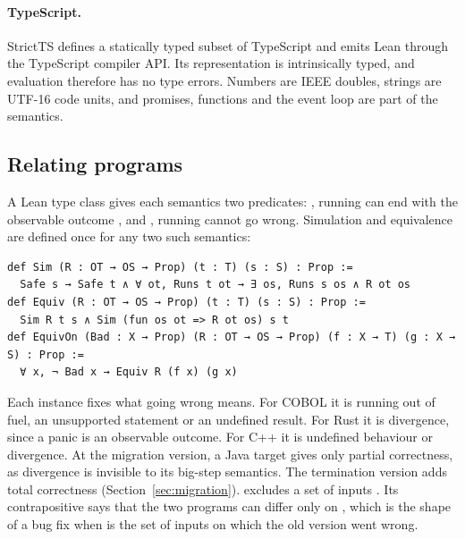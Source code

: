 \paragraph{TypeScript.} StrictTS defines a statically typed subset of TypeScript and emits Lean through the TypeScript
compiler API. Its representation is intrinsically typed, and evaluation therefore has no type errors. Numbers are IEEE
doubles, strings are UTF-16 code units, and promises,  functions and the event loop are part of the
semantics.

\subsection{Relating programs}

A Lean type class gives each semantics two predicates: , running  can end with the observable
outcome , and , running  cannot go wrong. Simulation and equivalence are defined once for
any two such semantics:
\begin{lstlisting}
def Sim (R : OT → OS → Prop) (t : T) (s : S) : Prop :=
  Safe s → Safe t ∧ ∀ ot, Runs t ot → ∃ os, Runs s os ∧ R ot os
def Equiv (R : OT → OS → Prop) (t : T) (s : S) : Prop :=
  Sim R t s ∧ Sim (fun os ot => R ot os) s t
def EquivOn (Bad : X → Prop) (R : OT → OS → Prop) (f : X → T) (g : X → S) : Prop :=
  ∀ x, ¬ Bad x → Equiv R (f x) (g x)
\end{lstlisting}
Each instance fixes what going wrong means. For COBOL it is running out of fuel, an unsupported statement or an
undefined result. For Rust it is divergence, since a panic is an observable outcome. For C++ it is undefined behaviour
or divergence. At the migration version, a Java target gives only partial correctness, as divergence is invisible to its big-step semantics. The termination
version adds total correctness (Section~\ref{sec:migration}).
 excludes a set of inputs . Its contrapositive says that the two programs can differ only on
, which is the shape of a bug fix when  is the set of inputs on which the old version went wrong.

